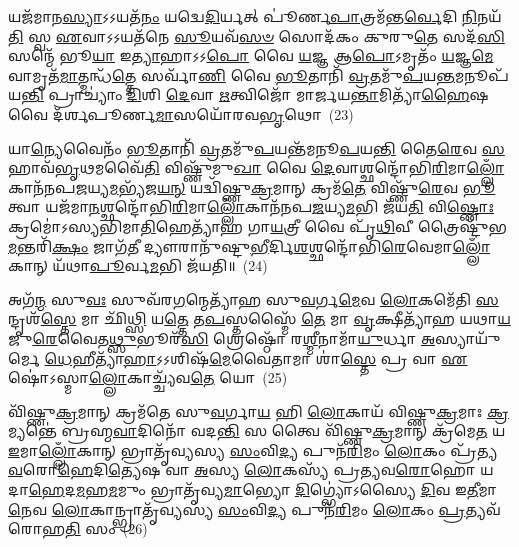 𑌯𑌜᳴𑌮𑌾𑌨\-\ul{𑌸𑍍𑌯𑌾}\-\-𑌽\-𑌽𑌯𑌤᳴\-\ul{𑌨𑌂} 𑌯𑌦𑍍𑌵𑍇\-\ul{𑌦𑌿}\-𑌰𑍍𑌯𑌤𑍍 𑌪𑍂॑𑌰𑍍𑌣\-\ul{𑌪𑌾}\-𑌤𑍍𑌰𑌮᳴𑌨𑍍𑌤\-\ul{𑌰𑍍𑌵𑍇}\-𑌦𑌿 \ul{𑌨𑌿}\-𑌨𑌯᳴\-\ul{𑌤𑌿} 𑌸𑍍𑌵 \ul{𑌏}\-𑌵𑌾\-𑌽\-𑌽𑌯𑌤᳴𑌨𑍇 \ul{𑌸𑍂}\-𑌯𑌵᳴\-\ul{𑌸}\-\-\ul{𑍞} 𑌸𑍋𑌦᳴𑌕𑌂 𑌕𑍁𑌰𑍁\-\ul{𑌤𑍇} 𑌸𑌦᳴\-\ul{𑌸𑌿} 𑌸𑌨𑍍𑌮𑍇᳴ 𑌭𑍂\-\ul{𑌯𑌾} 𑌇\-\ul{𑌤𑍍𑌯𑌾}\-𑌹𑌾\-𑌽\-𑌽\-\ul{𑌪𑍋} 𑌵𑍈 \ul{𑌯}\-𑌜𑍍𑌞 𑌆\-\ul{𑌪𑍋}\-\-𑌽𑌮𑍃𑌤𑌂᳴ \ul{𑌯}\-𑌜𑍍𑌞\-\ul{𑌮𑍇}\-𑌵𑌾𑌮𑍃𑌤᳴\-\ul{𑌮𑌾}\-𑌤𑍍𑌮𑌨𑍍𑌧᳴\-\ul{𑌤𑍍𑌤𑍇} 𑌸𑌰𑍍𑌵𑌾᳴\-\ul{𑌣𑌿} 𑌵𑍈 \ul{𑌭𑍂}\-𑌤𑌾𑌨𑌿᳴ \ul{𑌵𑍍𑌰}\-𑌤𑌮𑍁᳴\-\ul{𑌪}\-𑌯\-\ul{𑌨𑍍𑌤}\-𑌮𑌨𑍂𑌪᳴ 𑌯\-\ul{𑌨𑍍𑌤𑌿} 𑌪𑍍𑌰𑌾𑌚𑍍𑌯𑌾𑌂॑ \ul{𑌦𑌿}\-𑌶𑌿 \ul{𑌦𑍇}\-𑌵𑌾 \ul{𑌋}\-𑌤𑍍𑌵𑌿𑌜𑍋᳴ 𑌮𑌾𑌰𑍍𑌜𑌯\-\ul{𑌨𑍍𑌤𑌾}\-𑌮𑌿𑌤𑍍𑌯𑌾᳴\-\ul{𑌹𑍈}\-𑌷 𑌵𑍈 𑌦᳴𑌰𑍍\mbox{}𑌶𑌪𑍂𑌰𑍍𑌣\-\ul{𑌮𑌾}\-𑌸𑌯𑍋᳴𑌰𑌵\-\ul{𑌭𑍃}\-𑌥𑍋~(23)

𑌯𑌾\-\ul{𑌨𑍍𑌯𑍇}\-𑌵𑍈𑌨𑌂᳴ \ul{𑌭𑍂}\-𑌤𑌾𑌨𑌿᳴ \ul{𑌵𑍍𑌰}\-𑌤𑌮𑍁᳴\-\ul{𑌪}\-𑌯𑌨𑍍𑌤᳴𑌮𑌨𑍂\-\ul{𑌪}\-𑌯\-\ul{𑌨𑍍𑌤𑌿} 𑌤𑍈\-\ul{𑌰𑍇}\-𑌵 \ul{𑌸}\-𑌹𑌾𑌵᳴\-\ul{𑌭𑍃}\-𑌥𑌮𑌵𑍈᳴\-\ul{𑌤𑌿} 𑌵𑌿𑌷𑍍𑌣𑍁᳴𑌮𑍁\-\ul{𑌖𑌾} 𑌵𑍈 \ul{𑌦𑍇}\-𑌵𑌾𑌶𑍍𑌛𑌨𑍍𑌦𑍋᳴𑌭𑌿\-\ul{𑌰𑌿}\-𑌮𑌾\-\ul{𑌲𑍍𑌲𑍋𑌁}\-𑌕𑌾𑌨᳴𑌨𑌪\-\-\ul{𑌜}\-𑌯𑍍𑌯\-\ul{𑌮}\-𑌭𑍍𑌯᳴𑌜\-\ul{𑌯}\-\-\ul{𑌨𑍍} 𑌯𑌦𑍍𑌵𑌿᳴𑌷𑍍𑌣𑍁\-\ul{𑌕𑍍𑌰}\-𑌮𑌾𑌨𑍍 𑌕𑍍𑌰𑌮᳴\-\ul{𑌤𑍇} 𑌵𑌿𑌷𑍍𑌣𑍁᳴\-\ul{𑌰𑍇}\-𑌵 \ul{𑌭𑍂}\-𑌤𑍍𑌵𑌾 𑌯𑌜᳴𑌮𑌾\-\ul{𑌨}\-𑌶𑍍𑌛𑌨𑍍𑌦𑍋᳴𑌭𑌿\-\ul{𑌰𑌿}\-𑌮𑌾\-\ul{𑌲𑍍𑌲𑍋𑌁}\-𑌕𑌾𑌨᳴𑌨𑌪\-\ul{𑌜}\-𑌯𑍍𑌯\-\ul{𑌮}\-𑌭𑌿 𑌜᳴𑌯\-\ul{𑌤𑌿} 𑌵𑌿\-\ul{𑌷𑍍𑌣𑍋𑌃} 𑌕𑍍𑌰𑌮𑍋॑\-𑌽𑌸𑍍𑌯𑌭𑌿𑌮𑌾\-\ul{𑌤𑌿}\-𑌹𑍇𑌤𑍍𑌯𑌾᳴𑌹 𑌗𑌾\-\ul{𑌯}\-𑌤𑍍𑌰𑍀 𑌵𑍈 𑌪𑍃᳴\-\ul{𑌥𑌿}\-𑌵𑍀 𑌤𑍍𑌰𑍈𑌷𑍍𑌟𑍁᳴𑌭\-\ul{𑌮}\-𑌨𑍍𑌤𑌰𑌿᳴\-\ul{𑌕𑍍𑌷𑌂} 𑌜𑌾𑌗᳴\-\ul{𑌤𑍀} 𑌦𑍍𑌯𑍗𑌰𑌾𑌨𑍁᳴𑌷𑍍𑌟𑍁\-\ul{𑌭𑍀}\-𑌰𑍍𑌦𑌿\-\ul{𑌶}\-𑌶𑍍𑌛𑌨𑍍𑌦𑍋᳴𑌭𑌿\-\ul{𑌰𑍇}\-𑌵𑍇𑌮𑌾\-\ul{𑌲𑍍𑌲𑍋𑌁}\-𑌕𑌾𑌨𑍍 𑌯᳴𑌥𑌾\-\ul{𑌪𑍂}\-𑌰𑍍𑌵\-\ul{𑌮}\-𑌭𑌿 𑌜᳴𑌯𑌤𑌿॥~(24)

{\anuvakamend[{𑌇\-\ul{𑌤𑍍𑌯𑍇}\-𑌤𑌦᳴𑌵\-\ul{𑌭𑍃}\-𑌥𑍋 𑌦𑌿𑌶𑌃᳴ \ul{𑌸}\-𑌪𑍍𑌤 𑌚᳴}]}%

𑌅𑌗᳴\-\ul{𑌨𑍍𑌮} 𑌸𑍁\-\ul{𑌵𑌃} 𑌸𑍁𑌵᳴𑌰\-\ul{𑌗}\-𑌨𑍍𑌮𑍇𑌤𑍍𑌯𑌾᳴𑌹 𑌸𑍁\-\ul{𑌵}\-𑌰𑍍𑌗\-\ul{𑌮𑍇}\-𑌵 \ul{𑌲𑍋}\-𑌕𑌮𑍇᳴𑌤𑌿 \ul{𑌸}\-𑌨𑍍𑌦𑍃𑌶᳴\-\ul{𑌸𑍍𑌤𑍇} 𑌮𑌾 𑌛𑌿᳴\-\ul{𑌥𑍍𑌸𑌿} 𑌯\-\ul{𑌤𑍍𑌤𑍇} 𑌤\-\ul{𑌪}\-𑌸𑍍𑌤𑌸𑍍𑌮𑍈᳴ \ul{𑌤𑍇} 𑌮𑌾 \ul{𑌵𑍃}\-𑌕𑍍𑌷𑍀𑌤𑍍𑌯𑌾᳴𑌹 𑌯𑌥𑌾\-\ul{𑌯}\-𑌜𑍁\-\ul{𑌰𑍇}\-𑌵𑍈𑌤\-\ul{𑌥𑍍𑌸𑍁}\-𑌭𑍂𑌰᳴\-\ul{𑌸𑌿} 𑌶𑍍𑌰𑍇𑌷𑍍𑌠𑍋᳴ 𑌰\-\ul{𑌶𑍍𑌮𑍀}\-𑌨𑌾𑌮𑌾᳴\-\ul{𑌯𑍁}\-𑌰𑍍𑌧𑌾 \ul{𑌅}\-𑌸𑍍𑌯𑌾𑌯𑍁᳴𑌰𑍍𑌮𑍇 \ul{𑌧𑍇}\-𑌹𑍀𑌤𑍍𑌯𑌾᳴\-\ul{𑌹𑌾}\-\-𑌽\-𑌽𑌶𑌿𑌷᳴\-\ul{𑌮𑍇}\-𑌵𑍈𑌤𑌾𑌮𑌾 𑌶𑌾॑\-\ul{𑌸𑍍𑌤𑍇} 𑌪𑍍𑌰 𑌵𑌾 \ul{𑌏}\-𑌷𑍋॑\-𑌽𑌸𑍍𑌮𑌾\-\ul{𑌲𑍍𑌲𑍋}\-𑌕𑌾𑌚𑍍𑌚𑍍𑌯᳴𑌵\-\ul{𑌤𑍇} 𑌯𑍋~(25)

𑌵𑌿᳴𑌷𑍍𑌣𑍁\-\ul{𑌕𑍍𑌰}\-𑌮𑌾𑌨𑍍 𑌕𑍍𑌰𑌮᳴𑌤𑍇 𑌸𑍁\-\ul{𑌵}\-𑌰𑍍𑌗𑌾\-\ul{𑌯} 𑌹𑌿 \ul{𑌲𑍋}\-𑌕𑌾𑌯᳴ 𑌵𑌿𑌷𑍍𑌣𑍁\-\ul{𑌕𑍍𑌰}\-𑌮𑌾𑌃 \ul{𑌕𑍍𑌰}\-𑌮𑍍𑌯𑌨𑍍𑌤𑍇॑ 𑌬𑍍𑌰𑌹𑍍𑌮\-\ul{𑌵𑌾}\-𑌦𑌿𑌨𑍋᳴ 𑌵𑌦\-\ul{𑌨𑍍𑌤𑌿} 𑌸 𑌤𑍍𑌵𑍈 𑌵𑌿᳴𑌷𑍍𑌣𑍁\-\ul{𑌕𑍍𑌰}\-𑌮𑌾𑌨𑍍 𑌕𑍍𑌰᳴𑌮𑍇\-\ul{𑌤} 𑌯 \ul{𑌇}\-𑌮𑌾\-\ul{𑌲𑍍𑌲𑍋𑌁}\-𑌕𑌾𑌨𑍍 𑌭𑍍𑌰𑌾𑌤𑍃᳴𑌵𑍍𑌯𑌸𑍍𑌯 \ul{𑌸𑌂}\-𑌵𑌿\-\ul{𑌦𑍍𑌯} 𑌪𑍁𑌨᳴\-\ul{𑌰𑌿}\-𑌮𑌂 \ul{𑌲𑍋}\-𑌕𑌂 𑌪𑍍𑌰᳴𑌤𑍍𑌯\-\ul{𑌵}\-𑌰𑍋\-\ul{𑌹𑍇}\-𑌦𑌿\-\ul{𑌤𑍍𑌯𑍇}\-𑌷 𑌵𑌾 \ul{𑌅}\-𑌸𑍍𑌯 \ul{𑌲𑍋}\-𑌕𑌸𑍍𑌯᳴ 𑌪𑍍𑌰𑌤𑍍𑌯𑌵\-\ul{𑌰𑍋}\-𑌹𑍋 𑌯𑌦𑌾\-\ul{𑌹𑍇}\-𑌦\-\ul{𑌮}\-𑌹\-\ul{𑌮}\-𑌮𑍁𑌂 𑌭𑍍𑌰𑌾𑌤𑍃᳴𑌵𑍍𑌯\-\ul{𑌮𑌾}\-𑌭𑍍𑌯𑍋 \ul{𑌦𑌿}\-𑌗𑍍𑌭𑍍𑌯𑍋॑\-𑌽𑌸𑍍𑌯𑍈 \ul{𑌦𑌿}\-𑌵 𑌇\-\ul{𑌤𑍀}\-𑌮𑌾\-\ul{𑌨𑍇}\-𑌵 \ul{𑌲𑍋}\-𑌕𑌾𑌨𑍍𑌭𑍍𑌰𑌾𑌤𑍃᳴𑌵𑍍𑌯𑌸𑍍𑌯 \ul{𑌸𑌂}\-𑌵𑌿\-\ul{𑌦𑍍𑌯} 𑌪𑍁𑌨᳴\-\ul{𑌰𑌿}\-𑌮𑌂 \ul{𑌲𑍋}\-𑌕𑌂 \ul{𑌪𑍍𑌰}\-𑌤𑍍𑌯𑌵᳴𑌰𑍋𑌹\-\ul{𑌤𑌿} 𑌸𑌂~(26)

